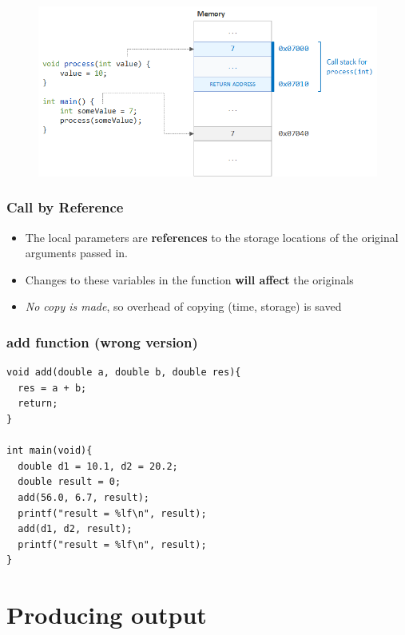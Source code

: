 \documentclass{../c-lecture}
\begin{document}
\begin{frame}
  \begin{figure}
    \includegraphics[width=\textwidth]{./img/pass-by-value.png}
  \end{figure}
\end{frame}

\begin{frame}
  \frametitle{Call by Reference}
  \begin{itemize}
    \item
      The local parameters are
      \textbf{\color{Orange} references} to the storage locations of
      the original arguments passed in.
    \item
      Changes to these variables in the function
      \textbf{\color{LimeGreen} will affect} the originals
    \item
      \textit{\color{Cyan} No copy is made}, so overhead of copying
      (time, storage) is saved
  \end{itemize}
\end{frame}

\begin{frame}[fragile]
  \frametitle{add function (wrong version)}
  \begin{verbatim}
void add(double a, double b, double res){
  res = a + b;
  return;
}

int main(void){
  double d1 = 10.1, d2 = 20.2;
  double result = 0;
  add(56.0, 6.7, result);
  printf("result = %lf\n", result);
  add(d1, d2, result);
  printf("result = %lf\n", result);
}
  \end{verbatim}
\end{frame}

\section{Producing output}
\end{document}

